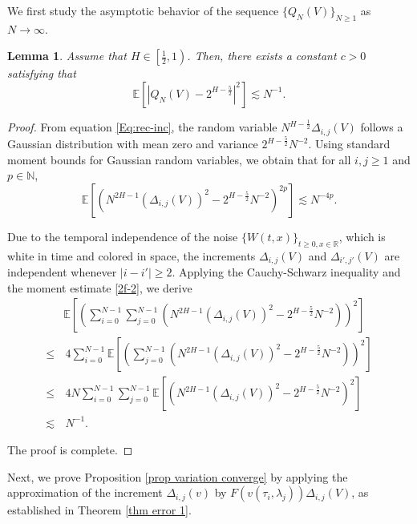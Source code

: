 \documentclass[11pt,reqno]{amsart}
\numberwithin{equation}{section}
\newtheorem{lemma}{Lemma}[section]
\newcommand{\1}{{\bf 1}}
\newcommand{\2}{{\bf 2}}
\begin{document}
  
  We first  study  the asymptotic behavior of the sequence   $\{Q_{N}(V)\}_{ N\ge 1}$  as $N\rightarrow\infty$.
  	 	   
	\begin{lemma}\label{lem linear app} Assume that $H\in \left[\frac12, 1\right)$. Then, there exists a constant $c>0$ satisfying that    
		\begin{equation}\label{2f-10}
			\mathbb{E}\left[ \left| Q_{N}(V) -2^{H-\frac{5}{2}}\right|^2   \right]  \lesssim N^{-1}.
					\end{equation} 
	\end{lemma}
 \begin{proof}
From  equation \eqref{Eq:rec-inc},  the random variable  $N^{H-\frac12} \Delta_{i,j}(V)$  follows a  Gaussian distribution with mean zero and   variance $2^{H-\frac{5}{2}}N^{-2}$.   Using  standard moment bounds for  Gaussian random variables, we obtain that for all $i, j\geq 1$ and $p\in \mathbb N$,	 	\begin{equation}\label{2f-2}
			\mathbb{E}\left[ \left(N^{2H-1} \left( \Delta_{i,j}(V) \right)^{2} -2^{H-\frac{5}{2}}N^{-2}\right) ^{2p}\right]\lesssim  N^{-4p}.
		\end{equation} 
	
	Due to the temporal independence  of the  noise $\{W(t, x)\}_{t\ge0, x\in\mathbb R}$, which is white in time and colored in space,   	  the increments 
  $\Delta_{i,j}(V) $ and $\Delta_{i',j'}(V) $ are independent whenever  $|i-i'|\ge2$.  Applying  the  Cauchy-Schwarz  inequality and the moment estimate  \eqref{2f-2},  we derive
       \begin{align*}
&   \mathbb{E}\left[   \left(\sum_{i=0}^{N-1}\sum_{j=0}^{N-1}  \left( N^{2H-1}  \left(\Delta_{i,j}(V) \right)^{2} -2^{H-\frac{5}{2}}N^{-2}\right)  \right)^{2}\right]   \\
  \le &\, 4  \sum_{i=0}^{N-1}   \mathbb{E} \left[   \left(  \sum_{j=0}^{N-1}  \left( N^{2H-1}  \left(\Delta_{i,j}(V) \right)^{2} -2^{H-\frac{5}{2}}N^{-2}\right)  \right)^{2}\right] \\
  \le & \, 4 N \sum_{i=0}^{N-1}   \sum_{j=0}^{N-1}   \mathbb{E} \left[  \left( N^{2H-1}  \left(\Delta_{i,j}(V) \right)^{2} -2^{H-\frac{5}{2}}N^{-2}  \right)^{2}\right]\\
\lesssim  &\,  N^{-1}.
    \end{align*} 
   
    The proof is complete. 
     \end{proof}
 
 
   Next, we prove Proposition \ref{prop variation converge} by applying the  approximation of the increment $\Delta_{i,j}(v)$  by $F(v(\tau_i, \lambda_j))\Delta_{i,j}(V)$, as established  in Theorem \ref{thm error 1}.
	 	      
\end{document}
